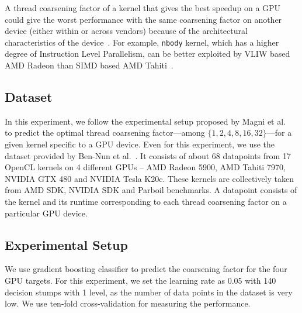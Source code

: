 A thread coarsening factor of a kernel that gives the best speedup on a GPU could give the worst performance with the same coarsening factor on another device (either within or across vendors) because of the architectural characteristics of the device~\cite{magni2014automatic, Stawinoga-10.1145/3194242}. For example, \texttt{nbody} kernel, which has a higher degree of Instruction Level Parallelism, can be better exploited by VLIW based AMD Radeon than SIMD based AMD Tahiti~\cite{magni2014automatic}.

\subsection{Dataset} 
In this experiment, we follow the experimental setup proposed by Magni et al.~\cite{magni2014automatic} to predict the optimal thread coarsening factor---among $\{1,2,4,8,16,32\}$---for a given kernel specific to a GPU device. Even for this experiment, we use the dataset provided by Ben-Nun et al.~\cite{ncc}. It consists of about 68 datapoints from 17 OpenCL kernels on 4 different GPUs -- AMD Radeon 5900, AMD Tahiti 7970, NVIDIA GTX 480 and NVIDIA Tesla K20c.
These kernels are collectively taken from AMD SDK, NVIDIA SDK and Parboil benchmarks.
A datapoint consists of the kernel and its runtime corresponding to each thread coarsening factor on a particular GPU device.

\subsection{Experimental Setup}
We use gradient boosting classifier to predict the coarsening factor for the four GPU targets. For this experiment, we set the learning rate as 0.05 with 140 decision stumps with 1 level, as the number of data points in the dataset is very low. We use ten-fold cross-validation for measuring the performance.

